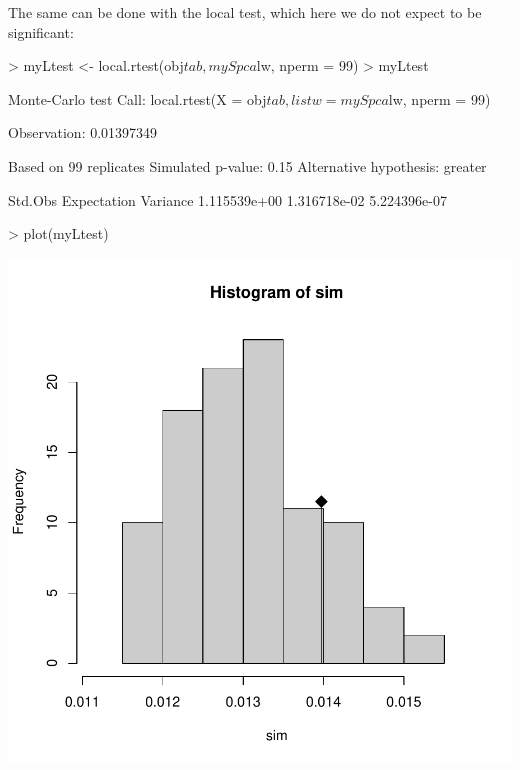 \documentclass{article}
\begin{document}
The same can be done with the local test, which here we do not expect
to be significant:
\begin{Schunk}
\begin{Sinput}
> myLtest <- local.rtest(obj$tab, mySpca$lw, nperm = 99)
> myLtest
\end{Sinput}
\begin{Soutput}
Monte-Carlo test
Call: local.rtest(X = obj$tab, listw = mySpca$lw, nperm = 99)

Observation: 0.01397349 

Based on 99 replicates
Simulated p-value: 0.15 
Alternative hypothesis: greater 

     Std.Obs  Expectation     Variance 
1.115539e+00 1.316718e-02 5.224396e-07 
\end{Soutput}
\begin{Sinput}
> plot(myLtest)
\end{Sinput}
\end{Schunk}
\includegraphics{figs/spca-localrtest}
~\\
\end{document}
